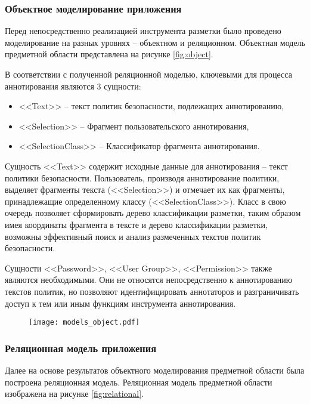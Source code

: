 \documentclass[../main]{subfiles}
\begin{document}
\subsubsection{Объектное моделирование приложения}

Перед непосредственно реализацией инструмента разметки было проведено моделирование на разных уровнях -- объектном и реляционном. Объектная модель предметной области представлена на рисунке \ref{fig:object}.

В соответствии с полученной реляционной моделью, ключевыми для процесса аннотирования являются 3 сущности:
\begin{itemize}
    \item <<Text>> -- текст политик безопасности, подлежащих аннотированию,
    \item <<Selection>> -- Фрагмент пользовательского аннотирования,
    \item <<SelectionClass>> -- Классификатор фрагмента аннотирования.
\end{itemize}

Сущность <<Text>> содержит исходные данные для аннотирования -- текст политики безопасности. Пользователь, производя аннотирование политики, выделяет фрагменты текста (<<Selection>>) и отмечает их как фрагменты, принадлежащие определенному классу (<<SelectionClass>>). Класс в свою очередь позволяет сформировать дерево классификации разметки, таким образом имея координаты фрагмента в тексте и дерево классификации разметки, возможны эффективный поиск и анализ размеченных текстов политик безопасности.

Сущности <<Password>>, <<User Group>>, <<Permission>> также являются необходимыми. Они не относятся непосредственно к аннотированию текстов политик, но позволяют идентифицировать аннотаторов и разграничивать доступ к тем или иным функциям инструмента аннотирования.

\begin{figure}[H]
    \centering
    {\texttt{[image: models\_object.pdf]}}
    \vspace{-\baselineskip}
\end{figure}

\subsubsection{Реляционная модель приложения}

Далее на основе результатов объектного моделирования предметной области была построена реляционная модель. Реляционная модель предметной области изображена на рисунке \ref{fig:relational}.
\end{document}
